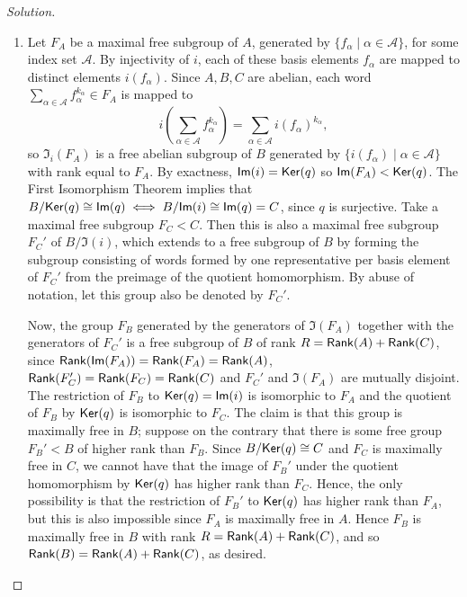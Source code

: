 \begin{proof}[Solution]

\hfill


\begin{enumerate}[font=\normalfont,label=\textbf{(\alph*)}, wide]
  \item Let $F_A$ be a maximal free subgroup of $A$, generated by $\{f_\alpha \mid \alpha \in \mathcal{A}\}$, for some index set $\mathcal{A}$. By injectivity of $i$, each of these basis elements $f_\alpha$ are mapped to distinct elements $i(f_\alpha)$. Since $A, B, C$ are abelian, each word $\sum_{\alpha \in \mathcal{A}} f_\alpha^{k_\alpha} \in F_A$ is mapped to
  \[
i \left(\sum_{\alpha \in \mathcal{A}} f_\alpha^{k_\alpha} \right) = \sum_{\alpha \in \mathcal{A}}i \left(f_\alpha\right)^{k_\alpha},
  \]
so $\Im_i(F_A)$ is a free abelian subgroup of $B$ generated by $\{i(f_\alpha) \mid \alpha \in \mathcal{A}\}$ with rank equal to $F_A$. By exactness, $\mathsf{Im}(i) = \mathsf{Ker}(q)$ so $\mathsf{Im}(F_A) < \mathsf{Ker}(q)$. The First Isomorphism Theorem implies that $B/\mathsf{Ker}(q) \cong \mathsf{Im}(q) \iff B/\mathsf{Im}(i) \cong \mathsf{Im}(q) = C$, since $q$ is surjective. Take a maximal free subgroup $F_C < C$. Then this is also a maximal free subgroup $F_C'$ of $B/\Im(i)$, which extends to a free subgroup of $B$ by forming the subgroup consisting of words formed by one representative per basis element of $F_C'$ from the preimage of the quotient homomorphism. By abuse of notation, let this group also be denoted by $F_C'$.

Now, the group $F_B$ generated by the generators of $\Im(F_A)$ together with the generators of $F_C'$ is a free subgroup of $B$ of rank $R = \mathsf{Rank}(A) + \mathsf{Rank}(C)$, since $\mathsf{Rank}(\mathsf{Im}(F_A)) = \mathsf{Rank}(F_A) = \mathsf{Rank}(A)$, $\mathsf{Rank}(F_C') = \mathsf{Rank}(F_C) = \mathsf{Rank}(C)$ and $F_C'$ and $\Im(F_A)$ are mutually disjoint. The restriction of $F_B$ to $\mathsf{Ker}(q) = \mathsf{Im}(i)$ is isomorphic to $F_A$ and the quotient of $F_B$ by $\mathsf{Ker}(q)$ is isomorphic to $F_C$. The claim is that this group is maximally free in $B$; suppose on the contrary that there is some free group $F_B' < B$ of higher rank than $F_B$. Since $B/\mathsf{Ker}(q) \cong C$ and $F_C$ is maximally free in $C$, we cannot have that the image of $F_B'$ under the quotient homomorphism by $\mathsf{Ker}(q)$ has higher rank than $F_C$. Hence, the only possibility is that the restriction of $F_B'$ to $\mathsf{Ker}(q)$ has higher rank than $F_A$, but this is also impossible since $F_A$ is maximally free in $A$. Hence $F_B$ is maximally free in $B$ with rank $R = \mathsf{Rank}(A) + \mathsf{Rank}(C)$, and so $ \mathsf{Rank}(B) = \mathsf{Rank}(A) + \mathsf{Rank}(C)$, as desired.



\end{enumerate}
\end{proof}
